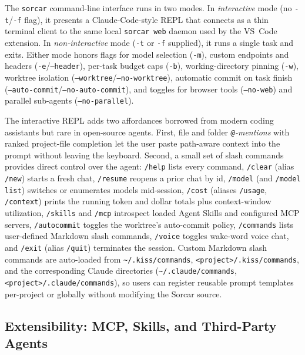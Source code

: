 \documentclass{article}
\begin{document}
The \texttt{sorcar} command-line interface runs in two modes.  In \emph{interactive} mode (no \texttt{-t}/\texttt{-f} flag), it presents a Claude-Code-style REPL that connects as a thin terminal client to the same local \texttt{sorcar web} daemon used by the VS~Code extension.  In \emph{non-interactive} mode (\texttt{-t} or \texttt{-f} supplied), it runs a single task and exits.  Either mode honors flags for model selection (\texttt{-m}), custom endpoints and headers (\texttt{-e}/\texttt{--header}), per-task budget caps (\texttt{-b}), working-directory pinning (\texttt{-w}), worktree isolation (\texttt{--worktree}/\texttt{--no-worktree}), automatic commit on task finish (\texttt{--auto-commit}/\texttt{--no-auto-commit}), and toggles for browser tools (\texttt{--no-web}) and parallel sub-agents (\texttt{--no-parallel}).

The interactive REPL adds two affordances borrowed from modern coding assistants but rare in open-source agents.  First, file and folder \emph{\texttt{@}-mentions} with ranked project-file completion let the user paste path-aware context into the prompt without leaving the keyboard.  Second, a small set of slash commands provides direct control over the agent: \texttt{/help} lists every command, \texttt{/clear} (alias \texttt{/new}) starts a fresh chat, \texttt{/resume} reopens a prior chat by id, \texttt{/model} (and \texttt{/model list}) switches or enumerates models mid-session, \texttt{/cost} (aliases \texttt{/usage}, \texttt{/context}) prints the running token and dollar totals plus context-window utilization, \texttt{/skills} and \texttt{/mcp} introspect loaded Agent Skills and configured MCP servers, \texttt{/autocommit} toggles the worktree's auto-commit policy, \texttt{/commands} lists user-defined Markdown slash commands, \texttt{/voice} toggles wake-word voice chat, and \texttt{/exit} (alias \texttt{/quit}) terminates the session.  Custom Markdown slash commands are auto-loaded from \texttt{\textasciitilde/.kiss/commands}, \texttt{<project>/.kiss/commands}, and the corresponding Claude directories (\texttt{\textasciitilde/.claude/commands}, \texttt{<project>/.claude/commands}), so users can register reusable prompt templates per-project or globally without modifying the Sorcar source.

\subsection{Extensibility: MCP, Skills, and Third-Party Agents}
\label{sec:ext-feature}
\end{document}
